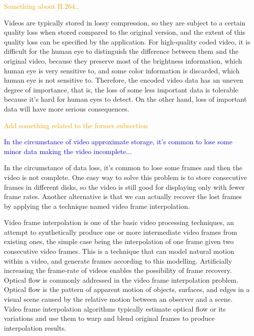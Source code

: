 \documentclass[sigconf]{acmart}
\begin{document}
\textcolor{orange}{Something about H.264\dots}



Videos are typically stored in lossy compression, so they are subject to a certain quality loss when stored compared to the original version, and the extent of this quality loss can be specified by the application. For high-quality coded video, it is difficult for the human eye to distinguish the difference between them and the original video, because they preserve most of the brightness information, which human eye is very sensitive to, and some color information is discarded, which human eye is not sensitive to. Therefore, the encoded video data has an uneven degree of importance, that is, the loss of some less important data is tolerable because it's hard for human eyes to detect. On the other hand, loss of important data will have more serious consequences.

\textcolor{orange}{Add something related to the former subsection}

\textcolor{blue}{In the circumstance of video approximate storage, it's common to lose some minor data making the video incomplete...}

In the circumstance of data loss, it's common to lose some frames and then the video is not complete. One easy way to solve this problem is to store consecutive frames in different disks, so the video is still good for displaying only with fewer frame rates. Another alternative is that we can actually recover the lost frames by applying the a technique named video frame interpolation.

Video frame interpolation is one of the basic video processing techniques, an attempt to synthetically produce one or more intermediate video frames from existing ones, the simple case being the interpolation of one frame given two consecutive video frames. This is a technique that can model natural motion within a video, and generate frames according to this modelling. Artificially increasing the frame-rate of videos enables the possibility of frame recovery. Optical flow is commonly addressed in the video frame interpolation problem. Optical flow is the pattern of apparent motion of objects, surfaces, and edges in a visual scene caused by the relative motion between an observer and a scene. Video frame interpolation algorithms typically estimate optical flow or its variations and use them to warp and blend original frames to produce interpolation results.
\end{document}
